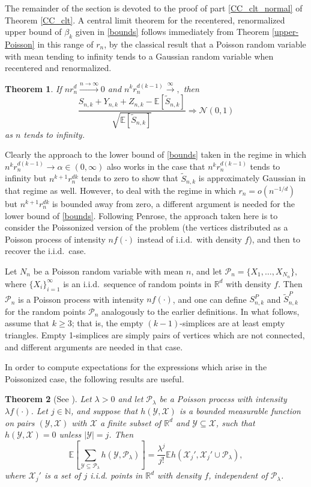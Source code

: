 \documentclass{amsart}
\newtheorem{thm}{Theorem}[section]
\theoremstyle{definition}
\newcommand{\R}{\mathbb{R}}
\newcommand{\E}{\mathbb{E}}
\newcommand{\N}{\mathbb{N}}
\newcommand{\X}{\mathcal{X}}
\newcommand{\Y}{\mathcal{Y}}
\newcommand{\s}{\widetilde{S}}
\newcommand{\p}{\mathcal{P}}
\renewcommand{\1}{\mathbb{1}}
\begin{document}
\bigskip

The remainder of the section is devoted to the proof of part \ref{CC_clt_normal}
of Theorem \ref{CC_clt}.   A central limit theorem for the
recentered, renormalized upper bound of $\beta_k$ given in  
\eqref{bounds} follows 
immediately from Theorem \ref{upper-Poisson} in this
range of $r_n$, by the classical
result that a Poisson random variable with mean
tending to infinity tends to a Gaussian random variable when recentered
and renormalized.
\begin{thm}\label{upper-normal}
If $nr_n^d\xrightarrow{n\to\infty}0$ and $n^kr_n^{d(k-1)}\xrightarrow\infty,$
then 
$$\frac{S_{n,k}+Y_{n,k}+Z_{n,k}-\E[\s_{n,k}]}{\sqrt{\E[\s_{n,k}]}}\Longrightarrow
\mathcal{N}(0,1)$$
as $n$ tends to infinity.
\end{thm}


Clearly the approach to the lower bound of \eqref{bounds} 
taken in the regime in which $n^kr_n^{d(k-1)}\to\alpha\in(0,\infty)$ 
also works in the case that 
$n^kr_n^{d(k-1)}$ tends to infinity but $n^{k+1}r_n^{dk}$ tends to
zero to show that $\s_{n,k}$ is approximately Gaussian in that regime as
well.  However, to deal with the regime
in which $r_n=o(n^{-1/d})$ but  $n^{k+1}r_n^{dk}$ is bounded away from zero,
a different argument is needed for the lower bound of \eqref{bounds}.  
Following Penrose, the approach taken
here is to consider the Poissonized version of the problem (the vertices
distributed as a Poisson process of intensity $nf(\cdot)$ instead of i.i.d.\ with 
density $f$), and then to recover the i.i.d.\ case.

Let $N_n$ be a Poisson random variable with mean $n$, and let $\p_n=
\{X_1,\ldots,X_{N_n}\},$ where $\{X_i\}_{i=1}^\infty$ is an i.i.d.\ sequence
of random points in $\R^d$ with density $f$.  Then $\p_n$ is a Poisson 
process with intensity $nf(\cdot)$, and one can define $S^P_{n,k}$ and 
$\s^P_{n,k}$ for the random points $\p_n$ analogously to the earlier 
definitions.  In what follows, assume that $k\ge 3$; that is, 
the empty $( k-1)$-simplices are at least empty triangles.  Empty 
1-simplices
are simply pairs of vertices which are not connected, and
different arguments are needed in that case.

In order to compute expectations for the expressions which arise in
the Poissonized case, the following results are
useful.

\begin{thm}[See \cite{penrose}]\label{one}
Let $\lambda>0$  and let $\p_\lambda$ be a Poisson process with intensity 
$\lambda f(\cdot)$.  Let 
$j\in\N$, and suppose that $h(\Y,\X)$ is a bounded measurable
function on pairs $(\Y,\X)$ with $\X$ a finite subset of $\R^d$ and 
$\Y\subseteq\X$, such that $h(\Y,\X)=0$ unless $|\Y|=j$.  Then
$$\E\left[\sum_{\Y\subseteq\p_\lambda}h(\Y,\p_\lambda)\right]=\frac{\lambda^j}{j!}
\E h(\X_j',\X_j'\cup\p_\lambda),$$
where $\X_j'$ is a set of $j$ i.i.d. points in $\R^d$ with density $f$, 
independent of $\p_\lambda$.
\end{thm}
\end{document}
